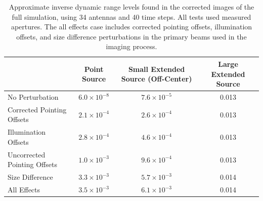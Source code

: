 \documentclass[11pt]{article}
\begin{document}
\begin{table}
    \centering
    \begin{tabular}{|p{3.5cm}|c|c|c|}
    \hline
    & Point Source & Small Extended Source \linebreak (Off-Center) & Large 
    Extended Source \\
    \hline
    No Perturbation & $6.0 \times 10^{-8}$ & $7.6 \times 10^{-5}$ & 0.013 \\
    \hline
    Corrected Pointing \linebreak Offsets & $2.1 \times 10^{-4}$ & $2.6 \times 
    10^{-4}$ & 0.013 \\
    \hline
    Illumination \linebreak Offsets & $2.8 \times 10^{-4}$ & $4.6 \times 
    10^{-4}$ & 0.013 \\
    \hline
    Uncorrected \linebreak Pointing Offsets & $1.0 \times 10^{-3}$ & $9.6 
    \times 10^{-4}$ & 0.013\\
    \hline
    Size Difference & $3.3 \times 10^{-3}$ & $5.7 \times 10^{-3}$ & 0.014 \\
    \hline
    All Effects\footnotemark & $3.5 \times 10^{-3}$ & $6.1 \times 10^{-3}$ & 
    0.014 \\
    \hline
    \end{tabular}
    \caption{
         Approximate inverse dynamic range levels found in the corrected images 
         of the full simulation, using 34 antennas and 40 time steps. All tests 
         used measured apertures. The all effects case includes corrected 
         pointing offsets, illumination offsets, and size difference 
         perturbations in the primary beams used in the imaging process.
    }
    \label{tab:rms-34ants}
\end{table}
\end{document}
